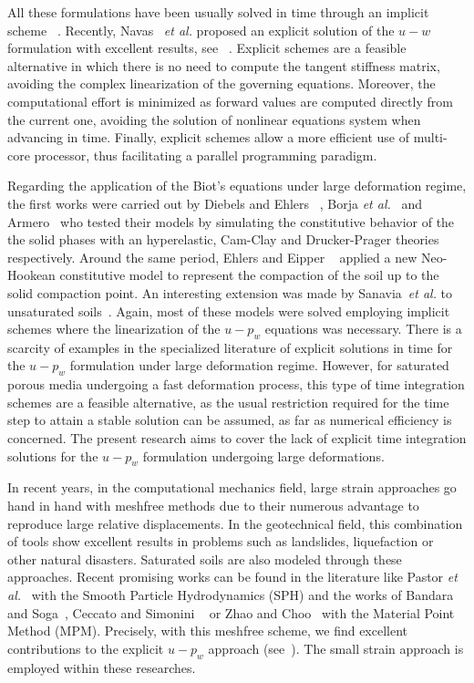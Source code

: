 \documentclass[twocolumn]{svjour3}          %
\newcommand{\etal}{
  \textit{et al.}
}
\begin{document}
 All these formulations have been usually solved in time through an implicit scheme ~\cite{borja95,borja98,Armero99,Ehlers:99,Navas:17c}. Recently, Navas~\etal proposed an explicit solution of the $u-w$ formulation with excellent results, see ~\cite{Navas:17b}. Explicit schemes are a feasible alternative in which there is no need to compute the tangent stiffness matrix, avoiding the complex linearization of the governing equations. Moreover, the computational effort is minimized as forward values are computed directly from the current one, avoiding the solution of nonlinear equations system when advancing in time. Finally, explicit schemes allow  a more efficient use of multi-core processor, thus facilitating a parallel programming paradigm.


Regarding the application of the Biot's equations under large deformation regime, the first works were  carried out by Diebels and Ehlers ~\cite{DiebelsE:96}, Borja \textit{et al.}~\cite{borja95,borja98} and Armero~\cite{Armero99} who tested their models by simulating the constitutive behavior of the the solid phases with an hyperelastic, Cam-Clay and Drucker-Prager theories respectively.  Around the same period, Ehlers and Eipper ~\cite{Ehlers:99} applied a new Neo-Hookean constitutive model to represent the compaction of the soil up to the solid compaction point. An interesting extension was made by Sanavia~\textit{et al.} to unsaturated soils~\cite{Sanavia:01,Sanavia:02b,Sanavia:02}. Again, most of these models were solved employing implicit schemes where the linearization of the $u-p_w$ equations was necessary. There is a scarcity of examples in the specialized literature of explicit solutions in time for the $u-p_w$ formulation under large deformation regime. However, for saturated porous media undergoing a fast deformation process, this type of time integration schemes are a feasible alternative, as the usual restriction required for the time step to attain a stable solution can be assumed, as far as numerical efficiency is concerned. The present research aims to cover the lack of explicit time integration solutions for the $u-p_w$ formulation undergoing large deformations.


In recent years, in the computational mechanics field, large strain approaches go hand in hand with meshfree methods due to their numerous advantage to reproduce large relative displacements. In the geotechnical field, this combination of tools show excellent results in problems such as landslides, liquefaction or other natural disasters. Saturated soils are also modeled through these approaches. Recent promising works can be found in the literature like Pastor {\it et al.}~\cite{Pastor2021} with the Smooth Particle Hydrodynamics (SPH) and the works of Bandara and Soga~\cite{Bandara2016a}, Ceccato and Simonini ~\cite{Ceccato:16} or Zhao and Choo~\cite{Choo2020} with the Material Point Method (MPM). Precisely, with this meshfree scheme, we find excellent contributions to the explicit $u-p_w$ approach (see~\cite{Zhang2009,Zheng2013}). The small strain approach is employed within these researches.
\end{document}
